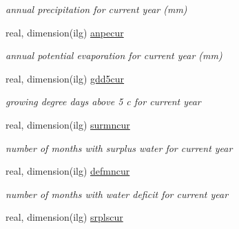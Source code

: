 \begin{DoxyCompactItemize}
\begin{DoxyCompactList}\small\item\em annual precipitation for current year (mm) \end{DoxyCompactList}\item 
\hypertarget{structctem__statevars_1_1veg__gat_a17bc486047d5649ac1491acf9b02e960}{}real, dimension(ilg) \hyperlink{structctem__statevars_1_1veg__gat_a17bc486047d5649ac1491acf9b02e960}{anpecur}\label{structctem__statevars_1_1veg__gat_a17bc486047d5649ac1491acf9b02e960}

\begin{DoxyCompactList}\small\item\em annual potential evaporation for current year (mm) \end{DoxyCompactList}\item 
\hypertarget{structctem__statevars_1_1veg__gat_afc7666a6ba90e49d22d3385ce95a33d2}{}real, dimension(ilg) \hyperlink{structctem__statevars_1_1veg__gat_afc7666a6ba90e49d22d3385ce95a33d2}{gdd5cur}\label{structctem__statevars_1_1veg__gat_afc7666a6ba90e49d22d3385ce95a33d2}

\begin{DoxyCompactList}\small\item\em growing degree days above 5 c for current year \end{DoxyCompactList}\item 
\hypertarget{structctem__statevars_1_1veg__gat_a19c2f10170e4d16e66258a5441c5f9be}{}real, dimension(ilg) \hyperlink{structctem__statevars_1_1veg__gat_a19c2f10170e4d16e66258a5441c5f9be}{surmncur}\label{structctem__statevars_1_1veg__gat_a19c2f10170e4d16e66258a5441c5f9be}

\begin{DoxyCompactList}\small\item\em number of months with surplus water for current year \end{DoxyCompactList}\item 
\hypertarget{structctem__statevars_1_1veg__gat_a97909b6438f3810938c18331463e1ddc}{}real, dimension(ilg) \hyperlink{structctem__statevars_1_1veg__gat_a97909b6438f3810938c18331463e1ddc}{defmncur}\label{structctem__statevars_1_1veg__gat_a97909b6438f3810938c18331463e1ddc}

\begin{DoxyCompactList}\small\item\em number of months with water deficit for current year \end{DoxyCompactList}\item 
\hypertarget{structctem__statevars_1_1veg__gat_a4651f0a8f8b38aaf3b5037396a38e05c}{}real, dimension(ilg) \hyperlink{structctem__statevars_1_1veg__gat_a4651f0a8f8b38aaf3b5037396a38e05c}{srplscur}\label{structctem__statevars_1_1veg__gat_a4651f0a8f8b38aaf3b5037396a38e05c}


\end{DoxyCompactItemize}
